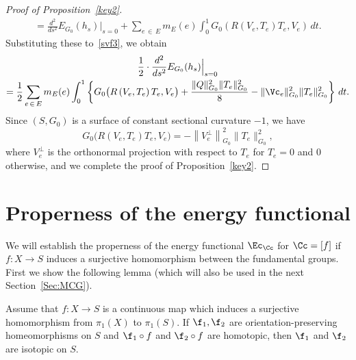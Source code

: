 \begin{proof}[{Proof of Proposition~\ref{key2}}]
\begin{multline*}
=\frac{d^2}{ds^2}E_{G_0}(h_s)\Big|_{s=0}+\sum_{e\,\in \,E}m_E(e)\int_0^1 G_0\left(R\left(V_e, T_e\right)T_e,V_e\right)\, dt.
\end{multline*}
Substituting these to~\eqref{svf3}, we obtain
\begin{multline*}
\frac{1}{2}\cdot \frac{d^2}{d s^2} E_{G_0}(h_{s})\Big{|}_{s=0}\\
=\frac{1}{2}\sum_{e\,\in\,E}m_E(e)\int_0^1\left\{G_0\big(R\left(V_e, T_e\right)T_e,V_e\big)+\frac{\|Q\|_{G_0}^2\|T_e\|_{G_0}^2}{8}-\|\Vc_e\|_{G_0}^2 \|T_e\|_{G_0}^2\right\}\, dt.
\end{multline*}
Since $(S,G_0)$ is a surface of constant sectional curvature $-1$, we have
\[
G_0\big(R(V_e, T_e)T_e,V_e\big)=-\left\|V_e^{\perp}\right\|^2_{G_0}\|T_e\|_{G_0}^2,
\]
where $V_e^{\perp}$ is the orthonormal projection with respect to $T_e$ for $T_e=0$ and $0$ otherwise, and we complete the proof of Proposition~\ref{key2}.
\end{proof}



\section{Properness of the energy functional}\label{Sec:proper}

We will establish the properness of the energy functional $\Ec_\Cc$ for $\Cc=[f]$ if $f:X \to S$ induces a surjective homomorphism between the fundamental groups. First we show the following lemma (which will also be used in the next Section~\ref{Sec:MCG}).


\begin{lemm}\label{Lem:homotopic}
Assume that $f:X \to S$ is a continuous map which induces a surjective homomorphism from $\pi_1(X)$ to $\pi_1(S)$. If $\f_1, \f_2$ are orientation-preserving homeomorphisms on $S$ and $\f_1 \circ f$ and $\f_2 \circ f$ are homotopic, then $\f_1$ and $\f_2$ are isotopic on $S$.
\end{lemm}

